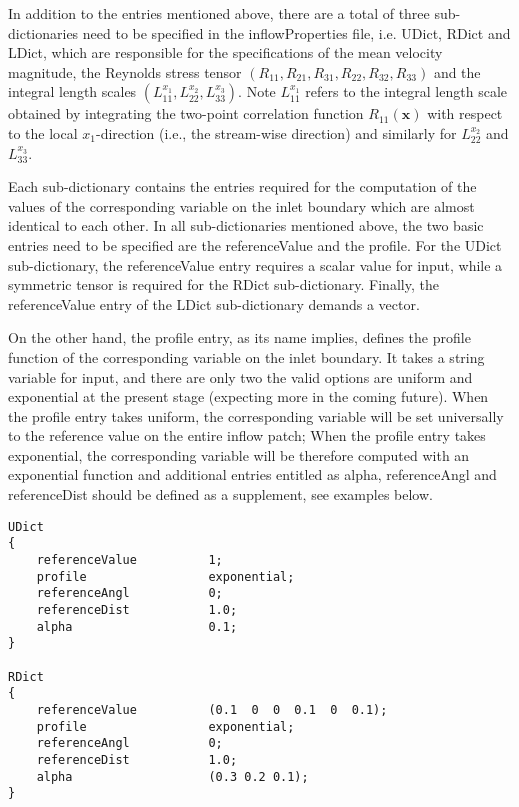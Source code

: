 \noindent In addition to the entries mentioned above, there are a total of three sub-dictionaries need to be specified in the \textcolor{mauve}{inflowProperties} file, i.e. \textcolor{mauve}{UDict}, \textcolor{mauve}{RDict} and \textcolor{mauve}{LDict}, which are responsible for the specifications of the mean velocity magnitude, the Reynolds stress tensor $(R_{11}, R_{21}, R_{31}, R_{22}, R_{32}, R_{33})$ and the integral length scales $(L_{11}^{x_1}, L_{22}^{x_2}, L_{33}^{x_3})$. Note $L_{11}^{x_1}$ refers to the integral length scale obtained by integrating the two-point correlation function $R_{11}(\boldsymbol{x})$ with respect to the local $x_1$-direction (i.e., the stream-wise direction) and similarly for $L_{22}^{x_2}$ and $L_{33}^{x_3}$.

Each sub-dictionary contains the entries required for the computation of the values of the corresponding variable on the inlet boundary which are almost identical to each other. In all sub-dictionaries mentioned above, the two basic entries need to be specified are the \textcolor{mauve}{referenceValue} and the \textcolor{mauve}{profile}. For the \textcolor{mauve}{UDict} sub-dictionary, the \textcolor{mauve}{referenceValue} entry requires a scalar value for input, while a symmetric tensor is required for the \textcolor{mauve}{RDict} sub-dictionary. Finally, the \textcolor{mauve}{referenceValue} entry of the \textcolor{mauve}{LDict} sub-dictionary demands a vector.

On the other hand, the \textcolor{mauve}{profile} entry, as its name implies, defines the profile function of the corresponding variable on the inlet boundary. It takes a string variable for input, and there are only two the valid options are \textcolor{mauve}{uniform} and \textcolor{mauve}{exponential} at the present stage (expecting more in the coming future). When the \textcolor{mauve}{profile} entry takes \textcolor{mauve}{uniform}, the corresponding variable will be set universally to the reference value on the entire inflow patch; When the \textcolor{mauve}{profile} entry takes \textcolor{mauve}{exponential}, the corresponding variable will be therefore computed with an exponential function and additional entries entitled as \textcolor{mauve}{alpha}, \textcolor{mauve}{referenceAngl} and \textcolor{mauve}{referenceDist} should be defined as a supplement, see examples below.

\begin{lstlisting}
UDict
{
    referenceValue          1;
    profile                 exponential;
    referenceAngl           0;
    referenceDist           1.0;
    alpha                   0.1;
}

RDict
{
    referenceValue          (0.1  0  0  0.1  0  0.1);
    profile                 exponential;
    referenceAngl           0;
    referenceDist           1.0;
    alpha                   (0.3 0.2 0.1);
}
\end{lstlisting}

